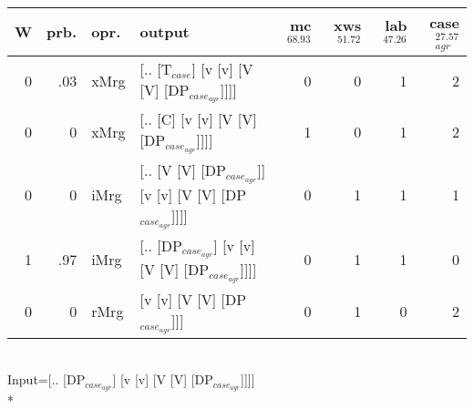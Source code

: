 \begin{tabularx}{\linewidth}{rrlXrrrr}
\hline
   W &   prb. & opr.   & output                                                   &   mc$^{68.93}$ &   xws$^{51.72}$ &   lab$^{47.26}$ &   case$_{agr}^{27.57}$ \\
\hline
   0 &   .03 & xMrg & [.. [T$_{case}$] [v [v] [V [V] [DP$_{case_{agr}}$]]]]              &            0 &             0 &             1 &                  2 \\
   0 &   0 & xMrg & [.. [C] [v [v] [V [V] [DP$_{case_{agr}}$]]]]                   &            1 &             0 &             1 &                  2 \\
   0 &   0 & iMrg & [.. [V [V] [DP$_{case_{agr}}$]] [v [v] [V [V] [DP$_{case_{agr}}$]]]] &            0 &             1 &             1 &                  1 \\
   1 &   .97 & iMrg & [.. [DP$_{case_{agr}}$] [v [v] [V [V] [DP$_{case_{agr}}$]]]]         &            0 &             1 &             1 &                  0 \\
   0 &   0 & rMrg & [v [v] [V [V] [DP$_{case_{agr}}$]]]                            &            0 &             1 &             0 &                  2 \\
\hline
\end{tabularx}\endgroup\\
\begingroup\scriptsize Input=[.. [DP$_{case_{agr}}$] [v [v] [V [V] [DP$_{case_{agr}}$]]]]\\*
